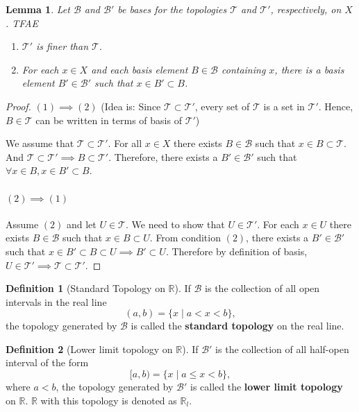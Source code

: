 \documentclass[12pt,reqno]{amsart}
\theoremstyle{plain}
\newtheorem{lem}{Lemma}
\theoremstyle{definition}
\newtheorem{defn}{Definition}
\begin{document}
\begin{lem}
    Let $\mathcal{B}$ and $\mathcal{B}'$ be bases for the topologies $\mathcal{T}$ and $\mathcal{T}'$, respectively, on $X$. TFAE
    \begin{enumerate}
        \item $\mathcal{T}'$ is finer than $\mathcal{T}.$
        \item For each $x \in X$ and each basis element $B \in \mathcal{B}$ containing $x$, there is a basis element $B' \in \mathcal{B}'$ such that $x \in B' \subset B$.
    \end{enumerate}
\end{lem}
\begin{proof}
    $(1) \implies (2)$ (Idea is: Since $\mathcal{T} \subset \mathcal{T}'$, every set of $\mathcal{T}$ is a set in $\mathcal{T}'$. Hence, $B \in \mathcal{T}$ can be written in terms of basis of $\mathcal{T}'$)
    \par \noindent We assume that $\mathcal{T} \subset \mathcal{T}'.$ For all $x \in X$ there exists $B \in \mathcal{B}$ such that $x \in B \subset \mathcal{T}$. And $\mathcal{T} \subset \mathcal{T}' \implies B \subset \mathcal{T}'$. Therefore, there exists a $B' \in \mathcal{B}'$ such that $ \forall x \in B, x \in B' \subset B$.
    \paragraph{$(2) \implies (1)$} Assume $(2)$ and let $U \in \mathcal{T}$. We need to show that $U \in \mathcal{T}'$. For each $x \in U$ there exists $B \in \mathcal{B}$ such that $x \in B \subset U$. From condition $(2)$, there exists a $B' \in \mathcal{B}'$ such that $x \in B' \subset B \subset U \implies B' \subset U$. Therefore by definition of basis, $U \in \mathcal{T}' \implies \mathcal{T} \subset \mathcal{T}'$.
\end{proof}
\begin{defn}[Standard Topology on $\mathbb{R}$]
    If $\mathcal{B}$ is the collection of all open intervals in the real line
    $$ (a,b) = \{x \mid a < x < b\},$$
    the topology generated by $\mathcal{B}$ is called the {\bf standard topology} on the real line.
\end{defn}
\begin{defn}[Lower limit topology on $\mathbb{R}$]
    If $\mathcal{B}'$ is the collection of all half-open interval of the form 
    $$ [a,b) = \{x \mid a \leq x < b\},$$
    where $a < b$, the topology generated by $\mathcal{B}'$ is called the {\bf lower limit topology} on $\mathbb{R}$. $\mathbb{R}$ with this topology is denoted as $\mathbb{R}_l$.
\end{defn}
\end{document}
